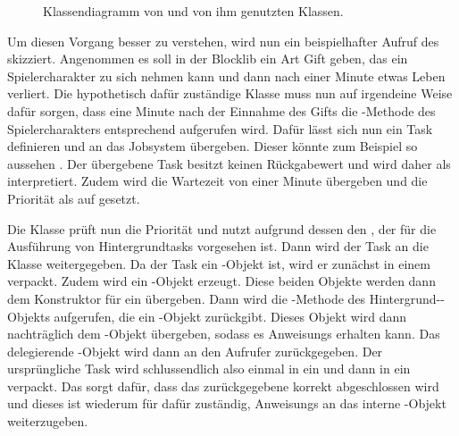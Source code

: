\begin{figure}
	\centering
	
	\caption{Klassendiagramm von  und von ihm genutzten Klassen.}\label{fig:wrapper}
\end{figure}

Um diesen Vorgang besser zu verstehen, wird nun ein beispielhafter Aufruf des  skizziert. Angenommen es soll in der Blocklib ein Art Gift geben, das ein Spielercharakter zu sich nehmen kann und dann nach einer Minute etwas Leben verliert. Die hypothetisch dafür zuständige Klasse muss nun auf irgendeine Weise dafür sorgen, dass eine Minute nach der Einnahme des Gifts die -Methode des Spielercharakters entsprechend aufgerufen wird. Dafür lässt sich nun ein Task definieren und an das Jobsystem übergeben. Dieser könnte zum Beispiel so aussehen . Der übergebene Task besitzt keinen Rückgabewert und wird daher als  interpretiert. Zudem wird die Wartezeit von einer Minute übergeben und die Priorität als auf  gesetzt.

Die Klasse  prüft nun die Priorität und nutzt aufgrund dessen den , der für die Ausführung von Hintergrundtasks vorgesehen ist. Dann wird der Task an die Klasse  weitergegeben. Da der Task ein -Objekt ist, wird er zunächst in einem  verpackt. Zudem wird ein -Objekt erzeugt. Diese beiden Objekte werden dann dem Konstruktor für ein  übergeben. Dann wird die -Methode des Hintergrund--Objekts aufgerufen, die ein -Objekt zurückgibt. Dieses Objekt wird dann nachträglich dem -Objekt übergeben, sodass es \glspl{Anweisung} erhalten kann. Das delegierende -Objekt wird dann an den Aufrufer zurückgegeben. Der ursprüngliche Task wird schlussendlich also einmal in ein  und dann in ein  verpackt. Das  sorgt dafür, dass das zurückgegebene  korrekt abgeschlossen wird und dieses ist wiederum für dafür zuständig, \glspl{Anweisung} an das interne -Objekt weiterzugeben.

